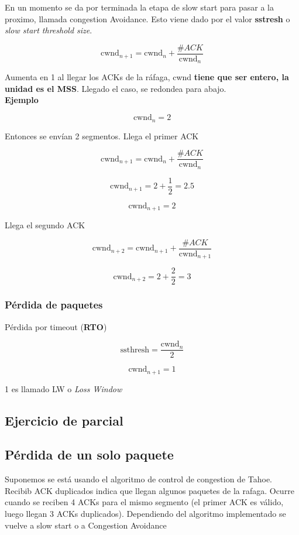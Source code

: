 \documentclass[titlepage,a4paper]{article}
\begin{document}
En un momento se da por terminada la etapa de slow start para pasar a la proximo, llamada congestion Avoidance. Esto viene dado por el valor \textbf{sstresh} o \textit{slow start threshold size}.

$$ \mathrm{cwnd}_{n+1} = \mathrm{cwnd}_n + \frac{\#ACK}{\mathrm{cwnd}_n} $$

Aumenta en 1 al llegar los ACKs de la ráfaga, cwnd \textbf{tiene que ser entero, la unidad es el MSS}. Llegado el caso, se redondea para abajo. \\

\textbf{Ejemplo}

$$\mathrm{cwnd}_n = 2$$

Entonces se envían 2 segmentos. Llega el primer ACK

$$ \mathrm{cwnd}_{n+1} = \mathrm{cwnd}_n +  \frac{\#ACK}{\mathrm{cwnd}_n} $$

$$ \mathrm{cwnd}_{n+1} = 2 +  \frac{1}{2} = 2.5 $$

$$ \mathrm{cwnd}_{n+1} = 2 $$

Llega el segundo ACK

$$ \mathrm{cwnd}_{n+2} = \mathrm{cwnd}_{n+1} +  \frac{\#ACK}{\mathrm{cwnd}_{n+1}} $$

$$ \mathrm{cwnd}_{n+2} = 2 +  \frac{2}{2} = 3 $$


\subsubsection{Pérdida de paquetes}

Pérdida por timeout (\textbf{RTO})

$$ \mathrm{ssthresh} = \frac{\mathrm{cwnd}_n}{2} $$

$$ \mathrm{cwnd}_{n+1} = 1  $$

1 es llamado LW o \textit{Loss Window}

\subsection{Ejercicio de parcial}




\subsection{Pérdida de un solo paquete}

Suponemos se está usando el algoritmo de control de congestion de Tahoe. 
Recibib ACK duplicados indica que llegan algunos paquetes de la rafaga. Ocurre cuando se reciben 4 ACKs para el mismo segmento (el primer ACK es válido, luego llegan 3 ACKs duplicados). Dependiendo del algoritmo implementado se vuelve a slow start o a Congestion Avoidance
\end{document}
